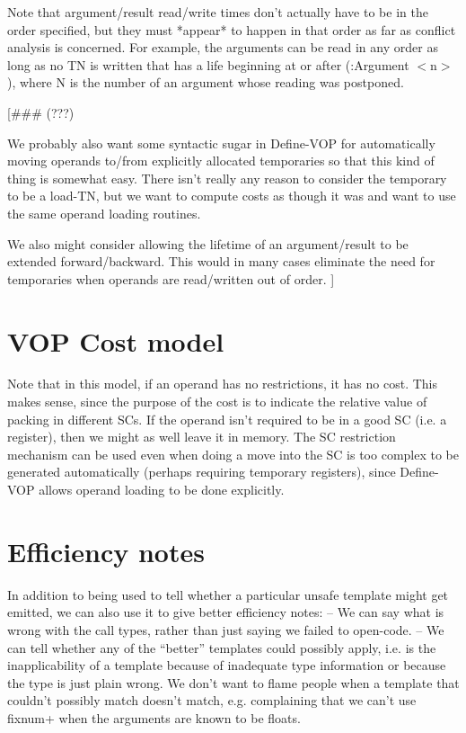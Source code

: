 Note that argument/result read/write times don't actually have to be in the
order specified, but they must *appear* to happen in that order as far as
conflict analysis is concerned.  For example, the arguments can be read in any
order as long as no TN is written that has a life beginning at or after
(:Argument $<$n$>$), where N is the number of an argument whose reading was
postponed.

[\#\#\# (???)

We probably also want some syntactic sugar in Define-VOP for automatically
moving operands to/from explicitly allocated temporaries so that this kind of
thing is somewhat easy.  There isn't really any reason to consider the
temporary to be a load-TN, but we want to compute costs as though it was and
want to use the same operand loading routines.

We also might consider allowing the lifetime of an argument/result to be
extended forward/backward.  This would in many cases eliminate the need for
temporaries when operands are read/written out of order.
]

\section{VOP Cost model}

Note that in this model, if an operand has no restrictions, it has no cost.
This makes sense, since the purpose of the cost is to indicate the
relative value of packing in different SCs.  If the operand isn't required to
be in a good SC (i.e. a register), then we might as well leave it in memory.
The SC restriction mechanism can be used even when doing a move into the SC is
too complex to be generated automatically (perhaps requiring temporary
registers), since Define-VOP allows operand loading to be done explicitly.

\section{Efficiency notes}

  In addition to
being used to tell whether a particular unsafe template might get emitted, we
can also use it to give better efficiency notes:
 -- We can say what is wrong with the call types, rather than just saying we
    failed to open-code.
 -- We can tell whether any of the ``better'' templates could possibly apply,
    i.e. is the inapplicability of a template because of inadequate type
    information or because the type is just plain wrong.  We don't want to
    flame people when a template that couldn't possibly match doesn't match,
    e.g. complaining that we can't use fixnum+ when the arguments are known to
    be floats.


